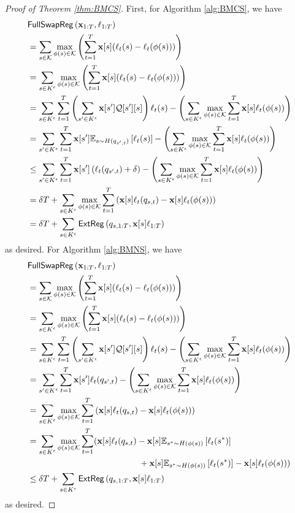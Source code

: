\begin{proof}[Proof of Theorem \ref{thm:BMCS}]
    First, for Algorithm \ref{alg:BMCS}, we have
    \begin{align*}
        &\mathsf{FullSwapReg}\left(\mathbf{x}_{1:T},\ell_{1:T}\right)\\
        &= \sum_{s \in \mathcal{K}} \max_{\phi(s) \in \mathcal{K}}\left(\sum_{t=1}^T \mathbf{x}[s](\ell_t(s) - \ell_t(\phi(s)))\right)\\
        &= \sum_{s \in K^{\epsilon}} \max_{\phi(s) \in \mathcal{K}}\left(\sum_{t=1}^T \mathbf{x}[s](\ell_t(s) - \ell_t(\phi(s)))\right)\\
        &=\sum_{s \in K^{\epsilon}} \sum_{t=1}^T \left(\sum_{s' \in K^{\epsilon}} \mathbf{x}[s']\mathcal{Q}[s'][s]\right)\ell_t(s) - \left(\sum_{s \in K^{\epsilon}} \max_{\phi(s) \in \mathcal{K}} \sum_{t=1}^T \mathbf{x}[s]\ell_t(\phi(s))\right) \\
        &=\sum_{s' \in K^{\epsilon}} \sum_{t=1}^T \mathbf{x}[s']\mathbb{E}_{s \sim H(q_{s',t})} \left[\ell_t(s)\right] - \left(\sum_{s \in K^{\epsilon}} \max_{\phi(s) \in \mathcal{K}} \sum_{t=1}^T \mathbf{x}[s]\ell_t(\phi(s))\right) \\
        &\leq \sum_{s' \in K^{\epsilon}} \sum_{t=1}^T \mathbf{x}[s']\left(\ell_t(q_{s',t})+\delta\right) - \left(\sum_{s \in K^{\epsilon}} \max_{\phi(s) \in \mathcal{K}} \sum_{t=1}^T \mathbf{x}[s]\ell_t(\phi(s))\right) \\
        &= \delta T + \sum_{s \in K^{\epsilon}} \max_{\phi(s) \in \mathcal{K}} \sum_{t=1}^T \left(\mathbf{x}[s]\ell_t(q_{s,t}) - \mathbf{x}[s]\ell_t(\phi(s))\right) \\
        &= \delta T + \sum_{s \in K^{\epsilon}} \mathsf{ExtReg}\left(q_{s,1:T},\mathbf{x}[s]\ell_{1:T}\right)
    \end{align*}
    as desired.  For Algorithm \ref{alg:BMNS}, we have
    \begin{align*}
        &\mathsf{FullSwapReg}\left(\mathbf{x}_{1:T},\ell_{1:T}\right)\\
        &= \sum_{s \in \mathcal{K}} \max_{\phi(s) \in \mathcal{K}}\left(\sum_{t=1}^T \mathbf{x}[s](\ell_t(s) - \ell_t(\phi(s)))\right)\\
        &= \sum_{s \in K^{\epsilon}} \max_{\phi(s) \in \mathcal{K}}\left(\sum_{t=1}^T \mathbf{x}[s](\ell_t(s) - \ell_t(\phi(s)))\right)\\
        &=\sum_{s \in K^{\epsilon}} \sum_{t=1}^T \left(\sum_{s' \in K^{\epsilon}} \mathbf{x}[s']\mathcal{Q}[s'][s]\right)\ell_t(s) - \left(\sum_{s \in K^{\epsilon}} \max_{\phi(s) \in \mathcal{K}} \sum_{t=1}^T \mathbf{x}[s]\ell_t(\phi(s))\right) \\
        &= \sum_{s' \in K^{\epsilon}} \sum_{t=1}^T \mathbf{x}[s']\ell_t(q_{s',t}) - \left(\sum_{s \in K^{\epsilon}} \max_{\phi(s) \in \mathcal{K}} \sum_{t=1}^T \mathbf{x}[s]\ell_t(\phi(s))\right) \\
        &= \sum_{s \in K^{\epsilon}} \max_{\phi(s) \in \mathcal{K}} \sum_{t=1}^T \left(\mathbf{x}[s]\ell_t(q_{s,t}) - \mathbf{x}[s]\ell_t(\phi(s))\right) \\
        &= \sum_{s \in K^{\epsilon}} \max_{\phi(s) \in \mathcal{K}} \sum_{t=1}^T (\mathbf{x}[s]\ell_t(q_{s,t}) - \mathbf{x}[s]\mathbb{E}_{s^* \sim H(\phi(s))} \left[\ell_t(s^*)\right]\\
        & \qquad \qquad \qquad \qquad \qquad \qquad \quad+ \mathbf{x}[s]\mathbb{E}_{s^* \sim H(\phi(s))} \left[\ell_t(s^*)\right] - \mathbf{x}[s]\ell_t(\phi(s))) \\
        &\leq \delta T + \sum_{s \in K^{\epsilon}} \mathsf{ExtReg}\left(q_{s,1:T},\mathbf{x}[s]\ell_{1:T}\right)
    \end{align*}
    as desired.
\end{proof}


